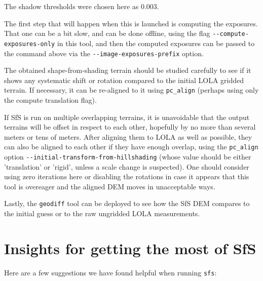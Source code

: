 The shadow thresholds were chosen here as 0.003.

The first step that will happen when this is launched is computing the
exposures. That one can be a bit slow, and can be done offline, using
the flag \texttt{-\/-compute-exposures-only} in this tool, and then the
computed exposures can be passed to the command above via the
\texttt{-\/-image-exposures-prefix} option.

The obtained shape-from-shading terrain should be studied carefully to
see if it shows any systematic shift or rotation compared to the initial
LOLA gridded terrain. If necessary, it can be re-aligned to it using
\texttt{pc\_align} (perhaps using only the compute translation flag).

If SfS is run on multiple overlapping terrains, it is unavoidable that
the output terrains will be offset in respect to each other, hopefully
by no more than several meters or tens of meters. After aligning them to
LOLA as well as possible, they can also be aligned to each other if they
have enough overlap, using the \texttt{pc\_align} option
\texttt{-\/-initial-transform-from-hillshading} (whose value should be
either 'translation' or 'rigid', unless a scale change is suspected).
One should consider using zero iterations here or disabling the
rotations in case it appears that this tool is overeager and the aligned
DEM moves in unacceptable ways.

Lastly, the \texttt{geodiff} tool can be deployed to see how the SfS DEM
compares to the initial guess or to the raw ungridded LOLA measurements.

\section{Insights for getting the most of SfS}
\label{sfs:insights}

Here are a few suggestions we have found helpful when running \texttt{sfs}:

